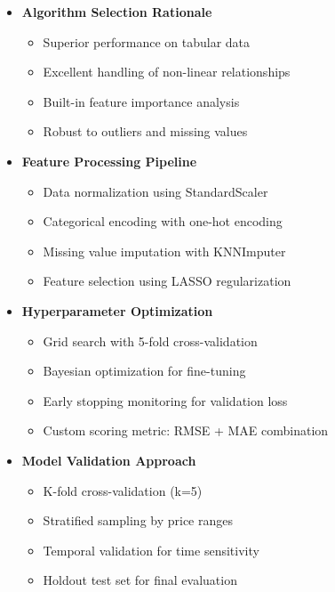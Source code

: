 \documentclass[12pt,a4paper]{report}
\begin{document}
\begin{itemize}
    \item \textbf{Algorithm Selection Rationale}
    \begin{itemize}
        \item Superior performance on tabular data
        \item Excellent handling of non-linear relationships
        \item Built-in feature importance analysis
        \item Robust to outliers and missing values
    \end{itemize}
    
    \item \textbf{Feature Processing Pipeline}
    \begin{itemize}
        \item Data normalization using StandardScaler
        \item Categorical encoding with one-hot encoding
        \item Missing value imputation with KNNImputer
        \item Feature selection using LASSO regularization
    \end{itemize}
    
    \item \textbf{Hyperparameter Optimization}
    \begin{itemize}
        \item Grid search with 5-fold cross-validation
        \item Bayesian optimization for fine-tuning
        \item Early stopping monitoring for validation loss
        \item Custom scoring metric: RMSE + MAE combination
    \end{itemize}
    
    \item \textbf{Model Validation Approach}
    \begin{itemize}
        \item K-fold cross-validation (k=5)
        \item Stratified sampling by price ranges
        \item Temporal validation for time sensitivity
        \item Holdout test set for final evaluation
    \end{itemize}
\end{itemize}
\end{document}

